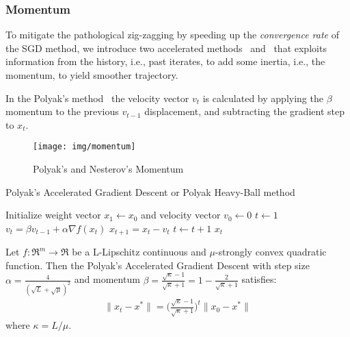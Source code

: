 
\subsubsection{Momentum}

To mitigate the pathological zig-zagging by speeding up the \emph{convergence rate} of the SGD method, we introduce two accelerated methods~\cite{polyak1964some} and~\cite{nesterov1998introductory, nesterov1983method} that exploits information from the history, i.e., past iterates, to add some inertia, i.e., the momentum, to yield smoother trajectory.

In the Polyak's method~\cite{polyak1964some} the velocity vector $v_t$ is calculated by applying the $\beta$ momentum to the previous $v_{t-1}$ displacement, and subtracting the gradient step to $x_t$.


\begin{figure}[h!]
	\centering
  	\texttt{[image: img/momentum]}
  	\caption{Polyak's and Nesterov's Momentum}
  	\label{fig:momentum}
\end{figure}

\begin{algorithm}[H]
	\caption{Polyak's Accelerated Gradient Descent or Polyak Heavy-Ball method}
	\label{alg:pag}
	\begin{algorithmic}
		\Require{Momentum $\beta \in [0,1)$}
			\State Initialize weight vector $x_1 \gets x_0$ and velocity vector $v_0 \gets 0$
			\State $t \gets 1$
				\State $v_t = \beta v_{t-1} + \alpha \nabla f(x_t)$
				\State $x_{t+1} = x_t - v_t$
				\State $t \gets t + 1$
			\EndWhile
			\State \Return $x_t$
		\EndFunction
	\end{algorithmic}
\end{algorithm}


\begin{theorem} \label{thm:quad_pag_convergence}
Let $f: \Re^m \rightarrow \Re$ be a L-Lipschitz continuous and $\mu$-strongly convex quadratic function. Then the Polyak's Accelerated Gradient Descent with step size $\alpha = \displaystyle \frac{4}{(\sqrt{L} + \sqrt{\mu})^2}$ and momentum $\beta = \displaystyle \frac{\sqrt{\kappa}-1}{\sqrt{\kappa}+1} = 1 - \frac{2}{\sqrt{\kappa}+1}$ satisfies:
$$
\begin{aligned}
	\| x_t - x^* \| = \bigg(\frac{\sqrt{\kappa}-1}{\sqrt{\kappa}+1}\bigg)^t \| x_0 - x^* \|
\end{aligned}
$$
where $\kappa = L/\mu$.
\end{theorem}

